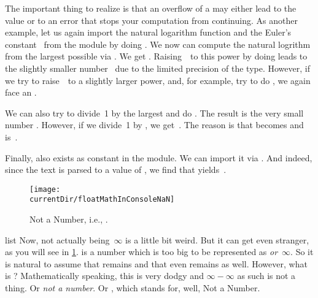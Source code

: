 The important thing to realize is that an overflow of a  may either lead to the  value or to an error that stops your computation from continuing.
As another example, let us again import the natural logarithm function  and the Euler's constant~ from the  module by doing .
We now can compute the natural logrithm from the largest possible  via .
We get .
Raising~\numberE\ to this power by doing  leads to the slightly smaller number~ due to the limited precision of the  type.
However, if we try to raise~\numberE\ to a slightly larger power, and, for example, try to do , we again face an .

We can also try to divide~1 by the largest  and do \pythonIdx{/}.
The result is the very small number .
However, if we divide~1 by , we get~.
The reason is that  becomes  and \pythonIdx{/} is~.

Finally,  also exists as constant in the  module.
We can import it via .
And indeed, since the text  is parsed to a  value of , we find that  yields~.

\begin{figure}%
\centering%
\texttt{[image: \\currentDir/floatMathInConsoleNaN]}%
\caption{Not a Number, i.e., .}%
\label{fig:floatMathInConsoleNaN}%
\end{figure}%
list
Now,  not actually being~$\infty$ is a little bit weird.
But it can get even stranger, as you will see in \cref{fig:floatMathInConsoleNaN}.
 is a number which is too big to be represented as  \emph{or}~$\infty$.
So it is natural to assume that  remains  and that even  remains  as well.
However, what is ?
Mathematically speaking, this is very dodgy and $\infty-\infty$ as such is not a thing.
Or \emph{not a number}.
Or , which stands for, well, Not a Number.

